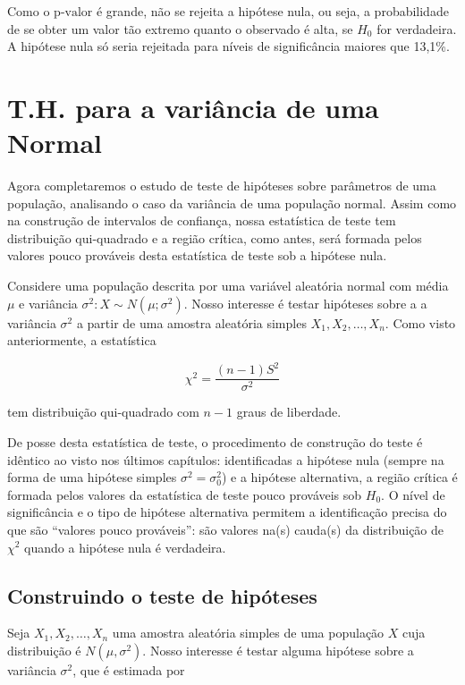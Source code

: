\documentclass[
]{book}
\begin{document}
Como o \(\text{p-valor}\) é grande, não se rejeita a hipótese nula, ou seja, a probabilidade de se obter um valor tão extremo quanto o observado é alta, se \(H_0\) for verdadeira. A hipótese nula só seria rejeitada para níveis de significância maiores que 13,1\%.

\hypertarget{t.h.-para-a-variuxe2ncia-de-uma-normal}{%
\section{T.H. para a variância de uma Normal}\label{t.h.-para-a-variuxe2ncia-de-uma-normal}}

Agora completaremos o estudo de teste de hipóteses sobre parâmetros de uma população, analisando o caso da variância de uma população normal. Assim como na construção de intervalos de confiança, nossa estatística de teste tem distribuição qui-quadrado e a região crítica, como antes, será formada pelos valores pouco prováveis desta estatística de teste sob a hipótese nula.

Considere uma população descrita por uma variável aleatória normal com média \(\mu\) e variância \(\sigma^2: X\sim N(\mu; \sigma^2)\). Nosso interesse é testar hipóteses sobre a a variância \(\sigma^2\) a partir de uma amostra aleatória simples \(X_1, X_2,\ldots, X_n\). Como visto anteriormente, a estatística

\[\chi^2=\frac{(n-1)S^2}{\sigma^2}\]

tem distribuição qui-quadrado com \(n-1\) graus de liberdade.

De posse desta estatística de teste, o procedimento de construção do teste é idêntico ao visto nos últimos capítulos: identificadas a hipótese nula (sempre na forma de uma hipótese simples \(\sigma^2=\sigma^2_0\)) e a hipótese alternativa, a região crítica é formada pelos valores da estatística de teste pouco prováveis sob \(H_0\). O nível de significância e o tipo de hipótese alternativa permitem a identificação precisa do que são ``valores pouco prováveis'': são valores na(s) cauda(s) da distribuição de \(\chi^2\) quando a hipótese nula é verdadeira.

\hypertarget{construindo-o-teste-de-hipuxf3teses-3}{%
\subsection{Construindo o teste de hipóteses}\label{construindo-o-teste-de-hipuxf3teses-3}}

Seja \(X_1, X_2,\ldots, X_n\) uma amostra aleatória simples de uma população \(X\) cuja distribuição é \(N(\mu,\sigma^2)\). Nosso interesse é testar alguma hipótese sobre a variância \(\sigma^2\), que é estimada por
\end{document}
